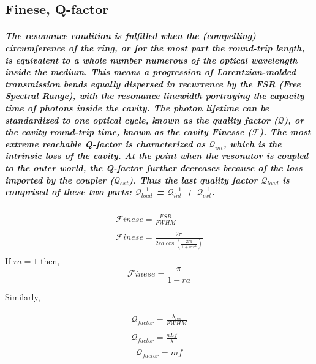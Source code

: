 \subsection{Finese, Q-factor}
\subparagraph{\normalfont \large The resonance condition is fulfilled when the (compelling) circumference of the ring, or for the most part the round-trip length, is equivalent to a whole number numerous of the optical wavelength inside the medium. This means a progression of Lorentzian-molded transmission bends equally dispersed in recurrence by the FSR (Free Spectral Range), with the resonance linewidth portraying the capacity time of photons inside the cavity. The photon 	lifetime can be standardized to one optical cycle, known as the quality factor (${\mathcal Q}$), or the cavity round-trip time, known as the cavity Finesse (${\mathcal F}$). The most extreme reachable Q-factor is characterized as ${\mathcal Q_{int}}$, which is the intrinsic loss of the cavity. At the point when the resonator is coupled to the outer world, the Q-factor further decreases because of the loss imported by the coupler (${\mathcal Q_{ext}}$). Thus the last quality factor ${\mathcal Q_{load}}$ is comprised of these two parts: ${\mathcal Q_{load}^{-1}}$ = ${\mathcal Q_{int}^{-1}}$ + ${\mathcal Q_{ext}^{-1}}$.}

\begin{align*}
{\mathcal F}inese = \frac{FSR}{FWHM} \\ 
\\
{\mathcal F}inese = \frac{2\pi}{2ra\cos{(\frac{2ra}{1+a^{2}r^{2}})}} \\
\end{align*}
{\normalfont If $ra = 1$ then,} \\
\begin{equation}
{\mathcal F}inese = \frac{\pi}{1-ra}
\end{equation}

Similarly, 

\begin{align*}
{\mathcal Q}_{factor} = \frac{\lambda_{res}}{FWHM} \\ 
\\
{\mathcal Q}_{factor} = \frac{nLf}{\lambda} \\
\end{align*}
\begin{equation}
{\mathcal Q}_{factor} = m f
\end{equation}


